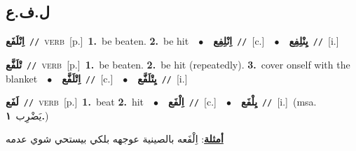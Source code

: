 \documentclass[10pt,a4paper,twoside]{article} %
\begin{document}
\begin{multicols}{2}
\vspace{-3mm}
\subsection*{\color{blue}\foreignlanguage{arabic}{ل.ف.ع}\color{blue}{}} 

{\setlength\topsep{0pt}\textbf{\foreignlanguage{arabic}{اِنْلَفَع}}\ {\color{gray}\texttt{//}\color{black}}\ \textsc{verb}\ [p.]\ \textbf{1.}~be beaten.  \textbf{2.}~be hit\ \ $\bullet$\ \ \setlength\topsep{0pt}\textbf{\foreignlanguage{arabic}{اِنْلِفِع}}\ {\color{gray}\texttt{//}\color{black}}\ [c.]\ \ $\bullet$\ \ \setlength\topsep{0pt}\textbf{\foreignlanguage{arabic}{يِنْلِفِع}}\ {\color{gray}\texttt{//}\color{black}}\ [i.]\ } \vspace{2mm}

{\setlength\topsep{0pt}\textbf{\foreignlanguage{arabic}{تْلَفَّع}}\ {\color{gray}\texttt{//}\color{black}}\ \textsc{verb}\ [p.]\ \textbf{1.}~be beaten.  \textbf{2.}~be hit (repeatedly).  \textbf{3.}~cover onself with the blanket\ \ $\bullet$\ \ \setlength\topsep{0pt}\textbf{\foreignlanguage{arabic}{اِتْلَفَّع}}\ {\color{gray}\texttt{//}\color{black}}\ [c.]\ \ $\bullet$\ \ \setlength\topsep{0pt}\textbf{\foreignlanguage{arabic}{يِتْلَفَّع}}\ {\color{gray}\texttt{//}\color{black}}\ [i.]\ } \vspace{2mm}

{\setlength\topsep{0pt}\textbf{\foreignlanguage{arabic}{لَفَع}}\ {\color{gray}\texttt{//}\color{black}}\ \textsc{verb}\ [p.]\ \textbf{1.}~beat  \textbf{2.}~hit\ \ $\bullet$\ \ \setlength\topsep{0pt}\textbf{\foreignlanguage{arabic}{اِلْفَع}}\ {\color{gray}\texttt{//}\color{black}}\ [c.]\ \ $\bullet$\ \ \setlength\topsep{0pt}\textbf{\foreignlanguage{arabic}{يِلْفَع}}\ {\color{gray}\texttt{//}\color{black}}\ [i.]\ \color{gray}(msa. \foreignlanguage{arabic}{يَضْرِب}~\foreignlanguage{arabic}{\textbf{١.}})\color{black}\  \begin{flushright}\color{gray}\foreignlanguage{arabic}{\textbf{\underline{\foreignlanguage{arabic}{أمثلة}}}: اِلْفَعه بالصينية عوجهه بلكي بيستحي شوي عدمه}\end{flushright}\color{black}} \vspace{2mm}


\end{multicols}
\end{document}
